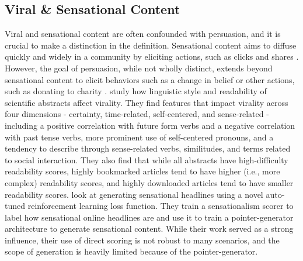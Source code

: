 \subsection{Viral \& Sensational Content}
\label{rel:viral}
Viral and sensational content are often confounded with persuasion, and it is crucial to make a distinction in the definition. Sensational content aims to diffuse quickly and widely in a community by eliciting actions, such as clicks and shares \citep{guerini2012linguistic}. However, the goal of persuasion, while not wholly distinct, extends beyond sensational content to elicit behaviors such as a change in belief or other actions, such as donating to charity \citep{wang2019persuasion}. \citet{guerini2012linguistic} study how linguistic style and readability of scientific abstracts affect virality. They find features that impact virality across four dimensions - certainty, time-related, self-centered, and sense-related - including a positive correlation with future form verbs and a negative correlation with past tense verbs, more prominent use of self-centered pronouns, and a tendency to describe through sense-related verbs, similitudes, and terms related to social interaction. They also find that while all abstracts have high-difficulty readability scores, highly bookmarked articles tend to have higher (i.e., more complex) readability scores, and highly downloaded articles tend to have smaller readability scores. \citet{xu2019clickbait} look at generating sensational headlines using a novel auto-tuned reinforcement learning loss function. They train a sensationalism scorer to label how sensational online headlines are and use it to train a pointer-generator architecture to generate sensational content. While their work served as a strong influence, their use of direct scoring is not robust to many scenarios, and the scope of generation is heavily limited because of the pointer-generator.


